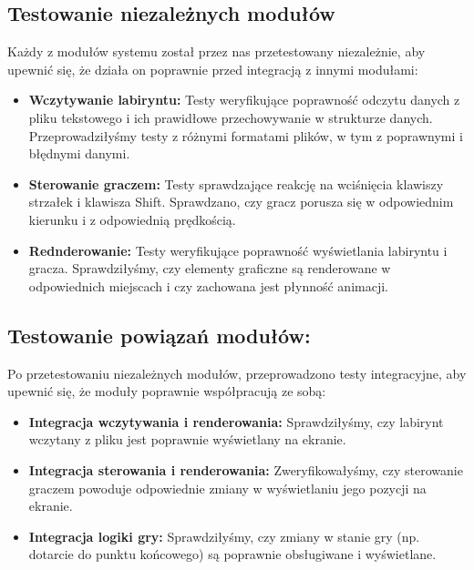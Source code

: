 \documentclass{article}
\begin{document}
\subsection{Testowanie niezależnych modułów}
Każdy z modułów systemu został przez nas przetestowany niezależnie, aby upewnić się, że działa on poprawnie przed integracją z innymi modułami:
\begin{itemize}
    \item \textbf{Wczytywanie labiryntu:} Testy weryfikujące poprawność odczytu danych z pliku tekstowego i ich prawidłowe przechowywanie w strukturze danych. Przeprowadziłyśmy testy z różnymi formatami plików, w tym z poprawnymi i błędnymi danymi.
    \item \textbf{Sterowanie graczem: }Testy sprawdzające reakcję na wciśnięcia klawiszy strzałek i klawisza Shift. Sprawdzano, czy gracz porusza się w odpowiednim kierunku i z odpowiednią prędkością.
    \item \textbf{Rednderowanie:} Testy weryfikujące poprawność wyświetlania labiryntu i gracza. Sprawdziłyśmy, czy elementy graficzne są renderowane w odpowiednich miejscach i czy zachowana jest płynność animacji.
\end{itemize}

\subsection{Testowanie powiązań modułów:} Po przetestowaniu niezależnych modułów, przeprowadzono testy integracyjne, aby upewnić się, że moduły poprawnie współpracują ze sobą:
\begin{itemize}
    \item \textbf{Integracja wczytywania i renderowania:} Sprawdziłyśmy, czy labirynt wczytany z pliku jest poprawnie wyświetlany na ekranie.
    \item \textbf{Integracja sterowania i renderowania:} Zweryfikowałyśmy, czy sterowanie graczem powoduje odpowiednie zmiany w wyświetlaniu jego pozycji na ekranie.
    \item \textbf{Integracja logiki gry:} Sprawdziłyśmy, czy zmiany w stanie gry (np. dotarcie do punktu końcowego) są poprawnie obsługiwane i wyświetlane.
\end{itemize}
\end{document}
